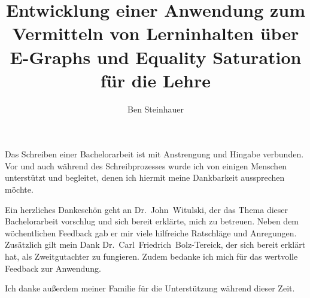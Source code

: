 \documentclass{hhuthesis}
\author{Ben Steinhauer}
\title{Entwicklung einer Anwendung zum Vermitteln von Lerninhalten über E-Graphs und Equality Saturation für die Lehre}
\begin{document}
\frontmatter
\makefrontmatter

\begin{acknowledgements}
Das Schreiben einer Bachelorarbeit ist mit Anstrengung und Hingabe verbunden.
Vor und auch während des Schreibprozesses wurde ich von einigen Menschen unterstützt
und begleitet, denen ich hiermit meine Dankbarkeit aussprechen möchte.

Ein herzliches Dankeschön geht an Dr.~John~Witulski, der das Thema dieser Bachelorarbeit
vorschlug und sich bereit erklärte, mich zu betreuen. Neben dem wöchentlichen 
Feedback gab er mir viele hilfreiche Ratschläge und Anregungen.
Zusätzlich gilt mein Dank Dr.~Carl~Friedrich~Bolz-Tereick, der sich bereit erklärt hat, 
als Zweitgutachter zu fungieren. Zudem bedanke ich mich für das wertvolle Feedback 
zur Anwendung.

Ich danke außerdem meiner Familie für die Unterstützung während dieser Zeit.
\end{acknowledgements}


\tableofcontents

\mainmatter




\appendix




\backmatter
\listoffigures
\lstlistoflistings
\doublespacing
\listofalgorithms
\singlespacing

\clearpage

\end{document}
